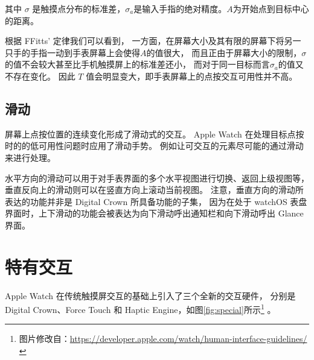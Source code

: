 其中 $\sigma$ 是触摸点分布的标准差，$\sigma_a$是输入手指的绝对精度。$A$为开始点到目标中心的距离。

根据 FFitts' 定律我们可以看到，
一方面，在屏幕大小及其有限的屏幕下将另一只手的手指一动到手表屏幕上会使得$A$的值很大，
而且正由于屏幕大小的限制，$\sigma$的值不会较大甚至比手机触摸屏上的标准差还小，
而对于同一目标而言$\sigma_a$的值又不存在变化。
因此 $T$ 值会明显变大，即手表屏幕上的点按交互可用性并不高。

\subsection{滑动}

屏幕上点按位置的连续变化形成了滑动式的交互。
Apple Watch 在处理目标点按时的的低可用性问题时应用了滑动手势。
例如让可交互的元素尽可能的通过滑动来进行处理。

水平方向的滑动可以用于对手表界面的多个水平视图进行切换、返回上级视图等，
垂直反向上的滑动则可以在竖直方向上滚动当前视图。
注意，垂直方向的滑动所表达的功能并非是 Digital Crown 所具备功能的子集，
因为在处于 watchOS 表盘界面时，上下滑动的功能会被表达为向下滑动呼出通知栏和向下滑动呼出 Glance 界面。

\section{特有交互}

Apple Watch 在传统触摸屏交互的基础上引入了三个全新的交互硬件，
分别是Digital Crown、Force Touch 和 Haptic Engine，如图\ref{fig:special}所示\footnote{图片修改自：\url{https://developer.apple.com/watch/human-interface-guidelines/}}
。


